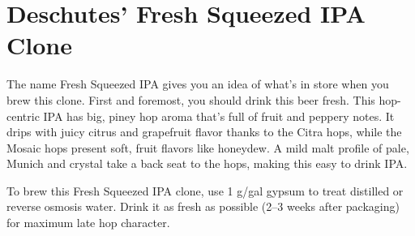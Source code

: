\documentclass[10pt,oneside]{scrbook}
\begin{document}
\pagebreak

\begin{ingredientsblock}

\begin{malts}
\end{malts}

\begin{hops}
\end{hops}

\begin{yeasts}
\end{yeasts}

\end{ingredientsblock}

\chapter*{Deschutes' Fresh Squeezed IPA Clone}

\begin{aboutblock}
The name Fresh Squeezed IPA gives you an idea of what's in store when you brew this clone. First and
foremost, you should drink this beer fresh. This hop-centric IPA has big, piney hop aroma that's full
of fruit and peppery notes. It drips with juicy citrus and grapefruit flavor thanks to the Citra hops,
while the Mosaic hops present soft, fruit flavors like honeydew. A mild malt profile of pale, Munich
and crystal take a back seat to the hops, making this easy to drink IPA.
\end{aboutblock}


\begin{methodandtiming}
 
\begin{mashsteps}
\end{mashsteps}

\begin{fermentationsteps}
\end{fermentationsteps}

\begin{directions}
To brew this Fresh Squeezed IPA clone, use 1 g/gal gypsum to treat distilled or reverse osmosis water. Drink it as fresh as possible (2--3 weeks after packaging) for maximum late hop character.
\end{directions}

\end{methodandtiming}
\end{document}
